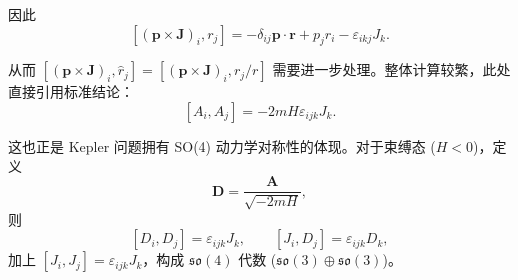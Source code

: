 \begin{question}
\begin{solution}
因此
\[
[(\boldsymbol p \times \boldsymbol J)_i, r_j] = -\delta_{ij}\boldsymbol p\!\cdot\!\boldsymbol r + p_j r_i - \varepsilon_{ikj}J_k.
\]

从而 \([(\boldsymbol p \times \boldsymbol J)_i, \hat r_j] = [(\boldsymbol p \times \boldsymbol J)_i, r_j/r]\) 需要进一步处理。整体计算较繁，此处直接引用标准结论：
\[
[A_i, A_j] = -2mH\varepsilon_{ijk}J_k.
\]

这也正是 Kepler 问题拥有 SO(4) 动力学对称性的体现。对于束缚态 (\(H<0\))，定义
\[
\boldsymbol D = \frac{\boldsymbol A}{\sqrt{-2mH}},
\]
则
\[
[D_i, D_j] = \varepsilon_{ijk}J_k,\qquad
[J_i, D_j] = \varepsilon_{ijk}D_k,
\]
加上 \([J_i, J_j] = \varepsilon_{ijk}J_k\)，构成 \(\mathfrak{so}(4)\) 代数 (\(\mathfrak{so}(3)\oplus\mathfrak{so}(3)\))。

\end{solution}
\end{question}

